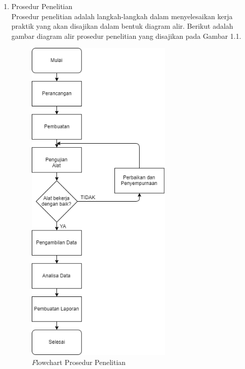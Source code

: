 \begin{enumerate}
	\item Prosedur Penelitian\\
	Prosedur penelitian adalah langkah-langkah dalam menyelesaikan kerja praktik yang akan disajikan dalam bentuk diagram alir. Berikut adalah gambar diagram alir prosedur penelitian yang disajikan pada Gambar 1.1.
	
	\begin{figure}[H]
		\centering
		\includegraphics[width=7cm]{gambar/flowchart.png}
		\caption{\emph Flowchart Prosedur Penelitian}
	\end{figure}
	
	
\end{enumerate}

